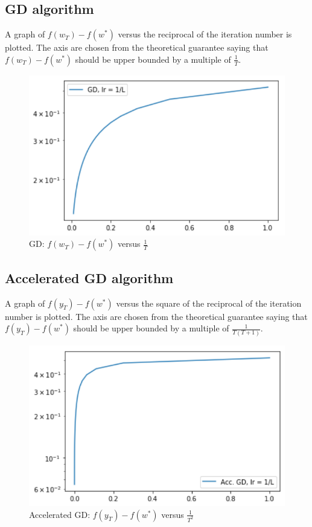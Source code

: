 \documentclass[10pt,conference,compsocconf]{IEEEtran}
\begin{document}
\subsection{GD algorithm}
A graph of $f(w_T)-f(w^*)$ versus the reciprocal of the iteration number is plotted. The axis are chosen from the theoretical guarantee saying that $f(w_T)-f(w^*)$ should be upper bounded by a multiple of $\frac{1}{T}$.
\begin{figure}[tbp]
  \centering
  \includegraphics[width=\columnwidth]{gd}
  \caption{GD: $f(w_T)-f(w^*)$ versus $\frac{1}{T}$}
  \vspace{-3mm}
  \label{fig:gd}
\end{figure}

\subsection{Accelerated GD algorithm}
A graph of $f(y_T)-f(w^*)$ versus the square of the reciprocal of the iteration number is plotted. The axis are chosen from the theoretical guarantee saying that $f(y_T)-f(w^*)$ should be upper bounded by a multiple of $\frac{1}{T(T+1)}$.
\begin{figure}[tbp]
  \centering
  \includegraphics[width=\columnwidth]{accgd}
  \caption{Accelerated GD: $f(y_T)-f(w^*)$ versus $\frac{1}{T^2}$}
  \vspace{-3mm}
  \label{fig:accgd}
\end{figure}
\end{document}
